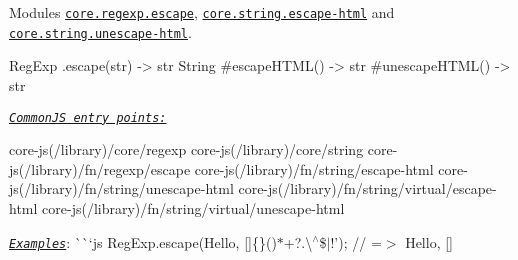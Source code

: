 Modules \href{https://github.com/zloirock/core-js/blob/v2.6.0/modules/core.regexp.escape.js}{\tt {\ttfamily core.\+regexp.\+escape}}, \href{https://github.com/zloirock/core-js/blob/v2.6.0/modules/core.string.escape-html.js}{\tt {\ttfamily core.\+string.\+escape-\/html}} and \href{https://github.com/zloirock/core-js/blob/v2.6.0/modules/core.string.unescape-html.js}{\tt {\ttfamily core.\+string.\+unescape-\/html}}. 
\begin{DoxyCode}
RegExp
  .escape(str) -> str
String
  #escapeHTML() -> str
  #unescapeHTML() -> str
\end{DoxyCode}
 \href{#commonjs}{\tt {\itshape Common\+JS entry points\+:}} 
\begin{DoxyCode}
core-js(/library)/core/regexp
core-js(/library)/core/string
core-js(/library)/fn/regexp/escape
core-js(/library)/fn/string/escape-html
core-js(/library)/fn/string/unescape-html
core-js(/library)/fn/string/virtual/escape-html
core-js(/library)/fn/string/virtual/unescape-html
\end{DoxyCode}
 \href{http://goo.gl/6bOvsQ}{\tt {\itshape Examples}}\+: \`{}\`{}`js Reg\+Exp.\+escape(\textquotesingle{}Hello, \mbox{[}\mbox{]}\{\}()$\ast$+?.\textbackslash{}$^\wedge$\$$\vert$!'); // =$>$ \textquotesingle{}Hello, \mbox{[}\mbox{]} 